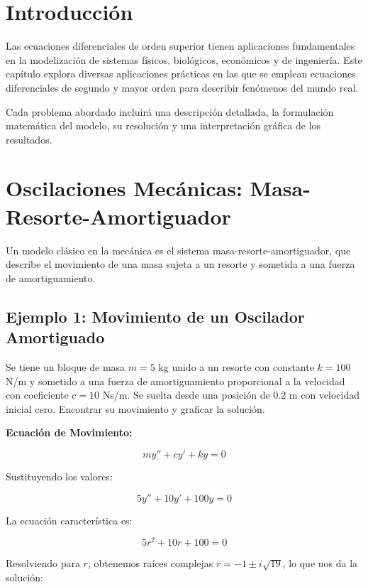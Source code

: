 
\section{Introducción}
Las ecuaciones diferenciales de orden superior tienen aplicaciones fundamentales en la modelización de sistemas físicos, biológicos, económicos y de ingeniería. Este capítulo explora diversas aplicaciones prácticas en las que se emplean ecuaciones diferenciales de segundo y mayor orden para describir fenómenos del mundo real. 

Cada problema abordado incluirá una descripción detallada, la formulación matemática del modelo, su resolución y una interpretación gráfica de los resultados.

\section{Oscilaciones Mecánicas: Masa-Resorte-Amortiguador}
Un modelo clásico en la mecánica es el sistema masa-resorte-amortiguador, que describe el movimiento de una masa sujeta a un resorte y sometida a una fuerza de amortiguamiento.

\subsection*{Ejemplo 1: Movimiento de un Oscilador Amortiguado}
Se tiene un bloque de masa \( m = 5 \) kg unido a un resorte con constante \( k = 100 \) N/m y sometido a una fuerza de amortiguamiento proporcional a la velocidad con coeficiente \( c = 10 \) Ns/m. Se suelta desde una posición de 0.2 m con velocidad inicial cero. Encontrar su movimiento y graficar la solución.

\textbf{Ecuación de Movimiento:}

\begin{equation}
m y'' + c y' + k y = 0
\end{equation}

Sustituyendo los valores:

\begin{equation}
5 y'' + 10 y' + 100 y = 0
\end{equation}

La ecuación característica es:

\begin{equation}
5r^2 + 10r + 100 = 0
\end{equation}

Resolviendo para \( r \), obtenemos raíces complejas \( r = -1 \pm i \sqrt{19} \), lo que nos da la solución:

